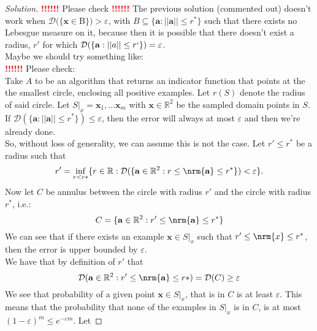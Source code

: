 \documentclass[10pt, a4paper, twoside]{amsart}
\newcommand{\R}{\ensuremath{\mathbb{R}}}
\DeclarePairedDelimiter{\nrm}\lVert\rVert
\newenvironment{solution}
               {\let\oldqedsymbol=\qedsymbol
                \renewcommand{\qedsymbol}{$\blacktriangleleft$}
                \begin{proof}[Solution]}
               {\end{proof}
                \renewcommand{\qedsymbol}{\oldqedsymbol}}
\newcommand{\TODO}{\textcolor{red}{\textbf{!!!!!! }}}
\begin{document}
\begin{solution}
    \TODO Please check \TODO
  The previous solution (commented out) doesn't work when $\mathcal{D}(\{\mathbf{x}\in $B$\})> \varepsilon$, with $B \subseteq \{\mathbf{a}: ||\mathbf{a}|| \leq r^*\}$ such that there exists no Lebesgue measure on it, because then it is possible that there doesn't exist a radius, $r'$ for which $\mathcal{D}(\{\mathbf{a}: ||a|| \leq r`\})=\varepsilon$. \\
  Maybe we should try something like: \\
  \TODO Please check: \\
  Take $A$ to be an algorithm that returns an indicator function that points at the the smallest circle, enclosing all positive examples. Let $r(S)$ denote the radius of said circle.
  Let $S|_x  = \mathbf{x}_1,\ldots \mathbf{x}_m$ with $\mathbf{x} \in \R^2$ be the sampled domain points in $S$. 
  If $\mathcal{D}(\{\mathbf{a}:||\mathbf{a}||\leq r^{*}\}) \leq \varepsilon $, 
  then the error will always at most $\varepsilon$ and then we're already done.\\
  So, without loss of generality, we can assume this is not the case.
  Let $r' \leq r^*$ be a radius such that
  \begin{equation*}
   r' = \inf_{r<r*} \{ r\in \R: \mathcal{D}(\{ \mathbf{a} \in \R^2: r \leq \nrm{\mathbf{a}} \leq r^*\}) < \varepsilon \}.
 \end{equation*}
  Now let $C$ be annulus between the circle with radius $r'$ and the circle with radius $r^*$, i.e.:
  \begin{equation*}
    C = \{\mathbf{a} \in \R^2: r' \leq \nrm{\mathbf{a}} \leq r^* \}
  \end{equation*}
  We can see that if there exists an example $\mathbf{x} \in S|_x$ such that $r'\leq \nrm{x} \leq r^*$, then the error is upper bounded by $\varepsilon$.\\
  We have that by definition of $r'$ that
  \begin{equation*}
    \mathcal{D}(\mathbf{a} \in \R^2: r' \leq \nrm{\mathbf{a}}\leq r*) = \mathcal{D}(C) \geq \varepsilon
  \end{equation*}
  We see that probability of a given point $\mathbf{x} \in S|_x$, that is in $C$ is at least $\varepsilon$. This means that the probability that none of the examples in $S|_x$ is in $C$, is at most $(1-\varepsilon)^m \leq e^{-\varepsilon m}$. Let


\end{solution}
\end{document}
